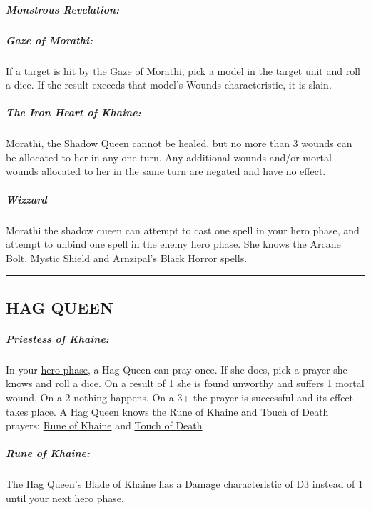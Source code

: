 \hypertarget{monstrous-revelation}{%
\subparagraph{Monstrous Revelation:}\label{monstrous-revelation}}

\hypertarget{gaze-of-morathi}{%
\subparagraph{Gaze of Morathi:}\label{gaze-of-morathi}}

If a target is hit by the Gaze of Morathi, pick a model in the target
unit and roll a dice. If the result exceeds that model's Wounds
characteristic, it is slain.

\hypertarget{the-iron-heart-of-khaine-1}{%
\subparagraph{The Iron Heart of
Khaine:}\label{the-iron-heart-of-khaine-1}}

Morathi, the Shadow Queen cannot be healed, but no more than 3 wounds
can be allocated to her in any one turn. Any additional wounds and/or
mortal wounds allocated to her in the same turn are negated and have no
effect.

\hypertarget{wizzard-1}{%
\subparagraph{Wizzard}\label{wizzard-1}}

Morathi the shadow queen can attempt to cast one spell in your hero
phase, and attempt to unbind one spell in the enemy hero phase. She
knows the Arcane Bolt, Mystic Shield and Arnzipal's Black Horror spells.

\begin{center}\rule{0.5\linewidth}{\linethickness}\end{center}

\hypertarget{hag-queen}{%
\subsection{HAG QUEEN}\label{hag-queen}}

\hypertarget{priestess-of-khaine}{%
\subparagraph{Priestess of Khaine:}\label{priestess-of-khaine}}

In your \protect\hyperlink{1.-Heldenphase}{hero phase}, a Hag Queen can
pray once. If she does, pick a prayer she knows and roll a dice. On a
result of 1 she is found unworthy and suffers 1 mortal wound. On a 2
nothing happens. On a 3+ the prayer is successful and its effect takes
place. A Hag Queen knows the Rune of Khaine and Touch of Death prayers:
\protect\hyperlink{Rune-of-Khaine:}{Rune of Khaine} and
\protect\hyperlink{Touch-of-Death:}{Touch of Death}

\hypertarget{rune-of-khaine}{%
\subparagraph{Rune of Khaine:}\label{rune-of-khaine}}

The Hag Queen's Blade of Khaine has a Damage characteristic of D3
instead of 1 until your next hero phase.

